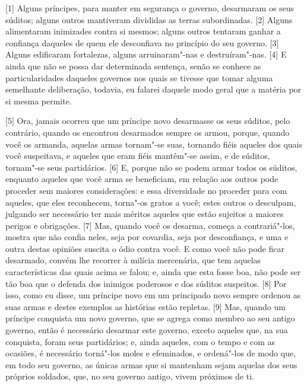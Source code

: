 
{[}1{]} Alguns príncipes, para manter em segurança o governo, desarmaram
os seus súditos; alguns outros mantiveram divididas as terras
subordinadas. {[}2{]} Alguns alimentaram inimizades contra si mesmos;
alguns outros tentaram ganhar a confiança daqueles de quem ele
desconfiava no princípio do seu governo. {[}3{]} Alguns edificaram
fortalezas, alguns arruinaram"-nas e destruíram"-nas. {[}4{]} E ainda que
não se possa dar determinada sentença, senão se conhece as
particularidades daqueles governos nos quais se tivesse que tomar alguma
semelhante deliberação, todavia, eu falarei daquele modo geral que a
matéria por si mesma permite.

{[}5{]} Ora, jamais ocorreu que um príncipe novo desarmasse os seus
súditos, pelo contrário, quando os encontrou desarmados sempre os armou,
porque, quando você os armanda, aquelas armas tornam"-se suas, tornando
fiéis aqueles dos quais você suspeitava, e aqueles que eram fiéis
mantêm"-se assim, e de súditos, tornam"-se seus partidários. {[}6{]} E,
porque não se podem armar todos os súditos, enquanto aqueles que você
arma se beneficiam, em relação aos outros pode proceder sem maiores
considerações: e essa diversidade no proceder para com aqueles, que eles
reconhecem, torna"-os gratos a você; estes outros o desculpam, julgando
ser necessário ter mais méritos aqueles que estão sujeitos a maiores
perigos e obrigações. {[}7{]} Mas, quando você os desarma, começa a
contrariá"-los, mostra que não confia neles, seja por covardia, seja por
desconfiança, e uma e outra destas opiniões suscita o ódio contra você.
E como você não pode ficar desarmado, convém lhe recorrer à milícia
mercenária, que tem aquelas características das quais acima se
falou; e, ainda que esta fosse boa,
não pode ser tão boa que o defenda dos inimigos poderosos e dos súditos
suspeitos. {[}8{]} Por isso, como eu disse, um príncipe novo em um
principado novo sempre ordenou as suas armas e destes exemplos as
histórias estão repletas. {[}9{]} Mas, quando um príncipe conquista um
novo governo, que se agrega como membro ao seu antigo governo, então é
necessário desarmar este governo, exceto aqueles que, na sua conquista,
foram seus partidários; e, ainda aqueles, com o tempo e com as ocasiões,
é necessário torná"-los moles e efeminados, e ordená"-los de modo que, em
todo seu governo, as únicas armas que si mantenham sejam aquelas dos
seus próprios soldados, que, no seu governo antigo, vivem próximos de
ti.

